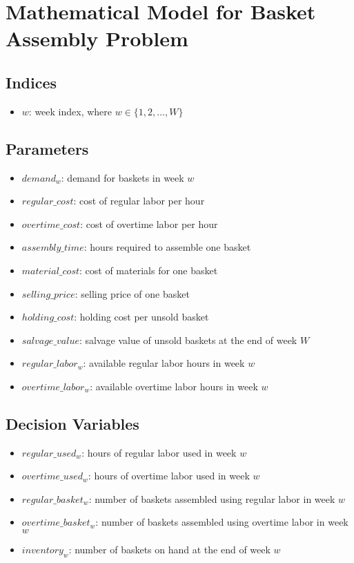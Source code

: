 \documentclass{article}
\begin{document}
\section*{Mathematical Model for Basket Assembly Problem}

\subsection*{Indices}
\begin{itemize}
    \item $w$: week index, where $w \in \{1, 2, \ldots, W\}$
\end{itemize}

\subsection*{Parameters}
\begin{itemize}
    \item $demand_w$: demand for baskets in week $w$
    \item $regular\_cost$: cost of regular labor per hour
    \item $overtime\_cost$: cost of overtime labor per hour
    \item $assembly\_time$: hours required to assemble one basket
    \item $material\_cost$: cost of materials for one basket
    \item $selling\_price$: selling price of one basket
    \item $holding\_cost$: holding cost per unsold basket
    \item $salvage\_value$: salvage value of unsold baskets at the end of week $W$
    \item $regular\_labor_w$: available regular labor hours in week $w$
    \item $overtime\_labor_w$: available overtime labor hours in week $w$
\end{itemize}

\subsection*{Decision Variables}
\begin{itemize}
    \item $regular\_used_w$: hours of regular labor used in week $w$
    \item $overtime\_used_w$: hours of overtime labor used in week $w$
    \item $regular\_basket_w$: number of baskets assembled using regular labor in week $w$
    \item $overtime\_basket_w$: number of baskets assembled using overtime labor in week $w$
    \item $inventory_w$: number of baskets on hand at the end of week $w$
\end{itemize}
\end{document}
